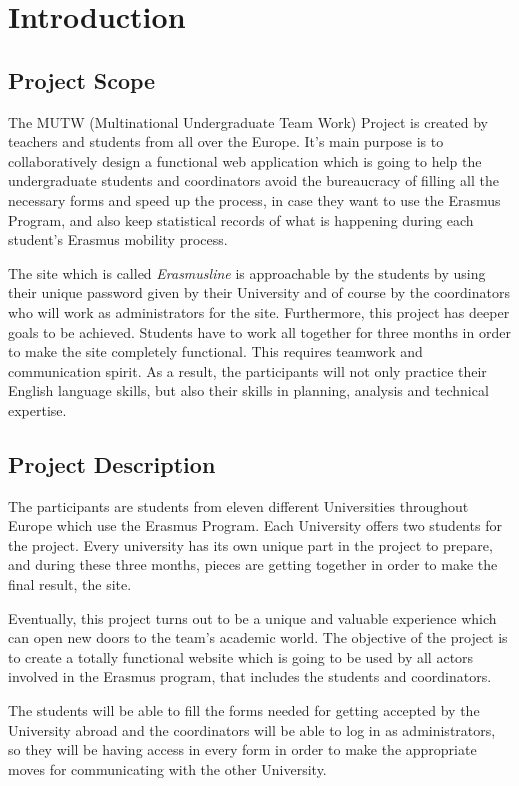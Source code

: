 \chapter{Introduction} \label{ch:intro}

\section{Project Scope} \label{sec:pscope}
The MUTW (Multinational Undergraduate Team Work) Project is created by teachers
and students from all over the Europe. It's main purpose is to collaboratively
design a functional web application which is going to help the undergraduate
students and coordinators avoid the bureaucracy of filling all the necessary
forms and speed up the process, in case they want to use the Erasmus Program,
and also keep statistical records of what is happening during each student's
Erasmus mobility process.

The site which is called \emph{Erasmusline} is approachable by the students by
using their unique password given by their University and of course by the
coordinators who will work as administrators for the site. Furthermore, this
project has deeper goals to be achieved. Students have to work all together for
three months in order to make the site completely functional. This requires
teamwork and communication spirit. As a result, the participants will not only
practice their English language skills, but also their skills in planning,
analysis and technical expertise.

\section{Project Description}

The participants are students from eleven different Universities throughout
Europe which use the Erasmus Program. Each University offers two students for
the project. Every university has its own unique part in the project to
prepare, and during these three months, pieces are getting together in order to
make the final result, the site.

Eventually, this project turns out to be a unique and valuable experience which
can open new doors to the team's academic world. The objective of the project 
is to create a totally functional website which is going to be used by all
actors involved in the Erasmus program, that includes the students and
coordinators.

The students will be able to fill the forms needed for getting accepted by the
University abroad and the coordinators will be able to log in as administrators,
so they will be having access in every form in order to make the appropriate
moves for communicating with the other University.

